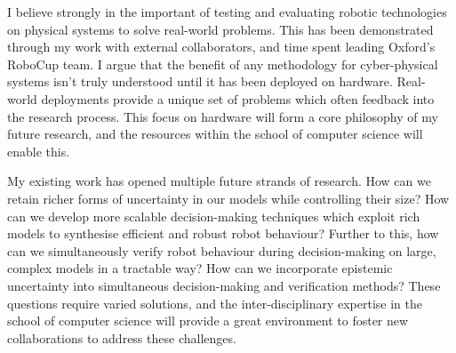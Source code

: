 \documentclass[11pt]{article}
\begin{document}

I believe strongly in the important of testing and evaluating robotic technologies on physical systems to solve real-world problems.
%
This has been demonstrated through my work with external collaborators, and time spent leading Oxford's RoboCup team.
%
I argue that the benefit of any methodology for cyber-physical systems isn't truly understood until it has been deployed on hardware.
%
Real-world deployments provide a unique set of problems which often feedback into the research process.
%
This focus on hardware will form a core philosophy of my future research, and the resources within the school of computer science will enable this.



My existing work has opened multiple future strands of research.
%
How can we retain richer forms of uncertainty in our models while controlling their size?
%
How can we develop more scalable decision-making techniques which exploit rich models to synthesise efficient and robust robot behaviour?
%
Further to this, how can we simultaneously verify robot behaviour during decision-making on large, complex models in a tractable way?
%
How can we incorporate epistemic uncertainty into simultaneous decision-making and verification methods?
%
These questions require varied solutions, and the inter-disciplinary expertise in the school of computer science will provide a great environment to foster new collaborations to address these challenges.
\end{document}
